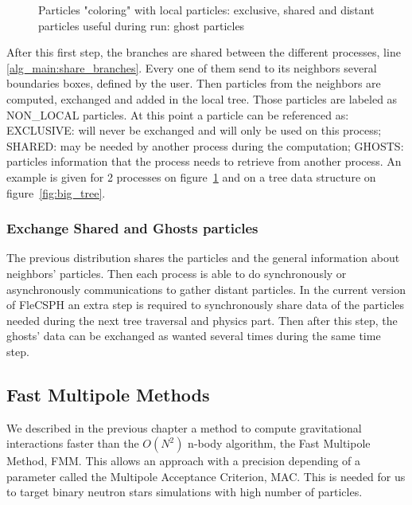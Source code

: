 \begin{figure}[t!]
\centering

\caption[Particle coloring based on FleCSI]{Particles "coloring" with local particles: exclusive, shared and distant particles useful during run: ghost particles}
\label{fig:coloring_particles}
\end{figure}

After this first step, the branches are shared between the different processes, line \ref{alg_main:share_branches}. 
Every one of them send to its neighbors several boundaries boxes, defined by the user. 
Then particles from the neighbors are computed, exchanged and added in the local tree. 
Those particles are labeled as NON\_LOCAL particles. 
At this point a particle can be referenced as: EXCLUSIVE: will never be exchanged and will only be used on this process; SHARED: may be needed by another process during the computation; GHOSTS: particles information that the process needs to retrieve from another process. 
An example is given for 2 processes on figure~\ref{fig:coloring_particles} and on a tree data structure on figure~\ref{fig:big_tree}.

\subsubsection{Exchange Shared and Ghosts particles}

The previous distribution shares the particles and the general information about neighbors’ particles. 
Then each process is able to do synchronously or asynchronously communications to gather distant particles. 
In the current version of FleCSPH an extra step is required to synchronously share data of the particles needed during the next tree traversal and physics part. 
Then after this step, the ghosts’ data can be exchanged as wanted several times during the same time step. 

\subsection{Fast Multipole Methods}

We described in the previous chapter a method to compute gravitational interactions faster than the $O(N^2)$ n-body algorithm, the Fast Multipole Method, FMM.
This allows an approach with a precision depending of a parameter called the Multipole Acceptance Criterion, MAC. 
This is needed for us to target binary neutron stars simulations with high number of particles.


